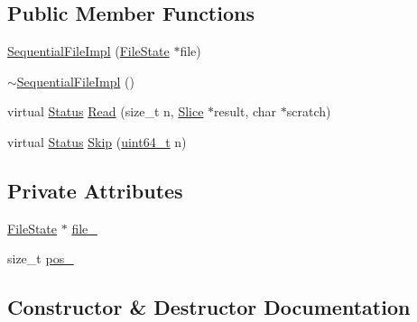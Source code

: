 \subsection*{Public Member Functions}
\begin{DoxyCompactItemize}
\item 
\hyperlink{classleveldb_1_1anonymous__namespace_02memenv_8cc_03_1_1_sequential_file_impl_ab19d3913c984ea369290f26678494a7b}{Sequential\+File\+Impl} (\hyperlink{classleveldb_1_1anonymous__namespace_02memenv_8cc_03_1_1_file_state}{File\+State} $\ast$file)
\item 
\hyperlink{classleveldb_1_1anonymous__namespace_02memenv_8cc_03_1_1_sequential_file_impl_a6bdbf79911e514447f2f029e0e75fbe2}{$\sim$\+Sequential\+File\+Impl} ()
\item 
virtual \hyperlink{classleveldb_1_1_status}{Status} \hyperlink{classleveldb_1_1anonymous__namespace_02memenv_8cc_03_1_1_sequential_file_impl_a99486281104ae9b92ae923181c69b322}{Read} (size\+\_\+t n, \hyperlink{classleveldb_1_1_slice}{Slice} $\ast$result, char $\ast$scratch)
\item 
virtual \hyperlink{classleveldb_1_1_status}{Status} \hyperlink{classleveldb_1_1anonymous__namespace_02memenv_8cc_03_1_1_sequential_file_impl_a2a2312a85a83ba2503c5f5da8810db7a}{Skip} (\hyperlink{stdint_8h_aaa5d1cd013383c889537491c3cfd9aad}{uint64\+\_\+t} n)
\end{DoxyCompactItemize}
\subsection*{Private Attributes}
\begin{DoxyCompactItemize}
\item 
\hyperlink{classleveldb_1_1anonymous__namespace_02memenv_8cc_03_1_1_file_state}{File\+State} $\ast$ \hyperlink{classleveldb_1_1anonymous__namespace_02memenv_8cc_03_1_1_sequential_file_impl_ac642ab422bdaafcc7f75dc14b399fd32}{file\+\_\+}
\item 
size\+\_\+t \hyperlink{classleveldb_1_1anonymous__namespace_02memenv_8cc_03_1_1_sequential_file_impl_aeca2cee028ac90de26788dcf0c0a8ba8}{pos\+\_\+}
\end{DoxyCompactItemize}


\subsection{Constructor \& Destructor Documentation}
\hypertarget{classleveldb_1_1anonymous__namespace_02memenv_8cc_03_1_1_sequential_file_impl_ab19d3913c984ea369290f26678494a7b}{}
